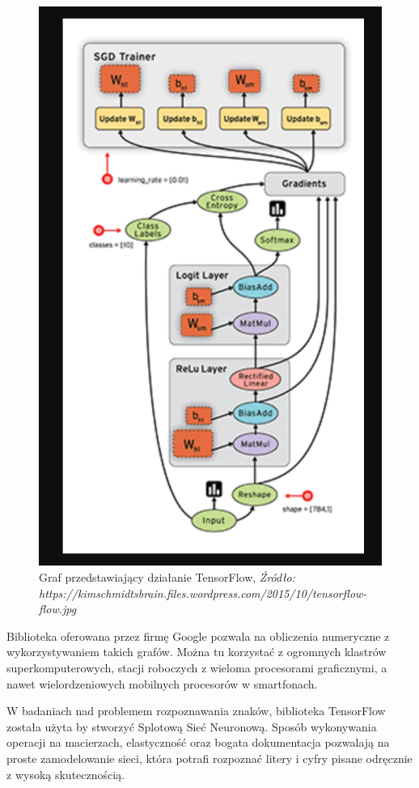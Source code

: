 \documentclass[brudnopis]{xmgr}
\begin{document}
\begin{figure}[!tbh]
\centering
\includegraphics[width=.8\hsize]{fig/tf}
\caption{Graf przedstawiający działanie TensorFlow, \emph{Źródło: https://kimschmidtsbrain.files.wordpress.com/2015/10/tensorflow-flow.jpg}}
\end{figure}
\newpage

Biblioteka oferowana przez firmę Google pozwala na obliczenia numeryczne z wykorzystywaniem takich grafów. Można tu korzystać z ogromnych klastrów superkomputerowych, stacji roboczych z wieloma procesorami graficznymi, a nawet wielordzeniowych mobilnych procesorów w smartfonach.

W badaniach nad problemem rozpoznawania znaków, biblioteka TensorFlow została użyta by stworzyć Splotową  Sieć Neuronową.  Sposób wykonywania operacji na macierzach, elastyczność oraz bogata dokumentacja pozwalają na proste zamodelowanie sieci, która  potrafi rozpoznać litery i cyfry pisane odręcznie z wysoką skutecznością.
\end{document}
